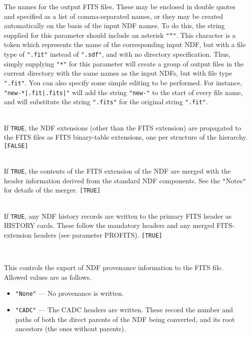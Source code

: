 \documentclass[twoside,11pt]{article}
\newcommand{\sstsubsection}[1]{ \item[{#1}] \mbox{} \\}
\newcommand{\ssthitemlist}[1]{
  \latexonly{
  \mbox{} \\
  \vspace{-3.5ex}
  }
  \begin{itemize}
     #1
  \end{itemize}
}
\newcommand{\sstitem}{\item}
\newcommand{\sstsubsection}[1]{\item[{#1}]}
\newcommand{\sstitem}{\item}
\begin{document}
{{{      }{
         The names for the output FITS files.  These may be enclosed in double
         quotes and specified as a list of comma-separated names, or they may
         be created automatically on the basis of the input NDF names. To do
         this, the string supplied for this parameter should include an
         asterisk \texttt{"$*$"}. This character is a token which represents
         the name of the corresponding input NDF, but with a file type of
         \texttt{".fit"} instead of \texttt{".sdf"}, and with no directory
         specification. Thus, simply supplying \texttt{"*"} for this parameter
         will create a group of output files in the current directory with the 
         same names as the input NDFs, but with file type \texttt{".fit"}. 
         You can also specify some simple editing to be performed. For instance,
         \texttt{"new-*|.fit|.fits|"} will add the string \texttt{"new-"} to
         the start of every file name, and will substitute the string
         \texttt{".fits"} for the original string \texttt{".fit"}.
      }
      \sstsubsection{
         PROEXTS = \_LOGICAL (Read)
      }{
         If \texttt{TRUE}, the NDF extensions (other than the FITS extension)
         are propagated to the FITS files as FITS binary-table
         extensions, one per structure of the hierarchy. \texttt{[FALSE]}
      }
      \sstsubsection{
         PROFITS = \_LOGICAL (Read)
      }{
         If \texttt{TRUE}, the contents of the FITS extension of the NDF are
         merged with the header information derived from the standard
         NDF components.  See the \texttt{"}Notes\texttt{"} for details of the merger.
         \texttt{[TRUE]}
      }
      \sstsubsection{
         PROHIS = \_LOGICAL (Read)
      }{
         If \texttt{TRUE}, any NDF history records are written to the primary
         FITS header as HISTORY cards.  These follow the mandatory
         headers and any merged FITS-extension headers (see parameter
         PROFITS). \texttt{[TRUE]}
      }
      \sstsubsection{
         PROVENANCE = LITERAL (Read)
      }{
         This controls the export of NDF provenance information to the 
         FITS file.  Allowed values are as follows.
         \ssthitemlist{

            \sstitem  
            \texttt{"None"} --- No provenance is written.

            \sstitem
            \texttt{"CADC"} --- The CADC headers are written.  These
	    record the number and paths of both the direct parents
	    of the NDF being converted, and its root ancestors (the
	    ones without parents).
 
}}}}
\end{document}
